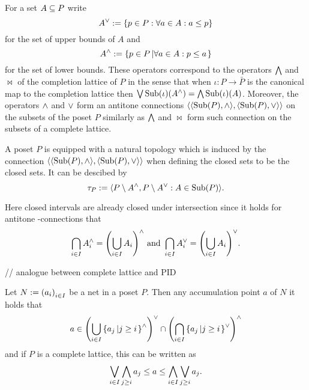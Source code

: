 \documentclass[8pt,a4paper]{article}
\begin{document}
\begin{definition}
    
\end{definition}%

%
\begin{definition}
    For a set $A\subseteq P$ write
    $$A^{\join}:=\set{p\in P: \forall a\in A: a\leq p}$$
    for the set of upper bounds of $A$ and
    $$A^{\meet}:=\set{p\in P}[\forall a\in A: p\leq a]$$
    for the set of lower bounds. These operators correspond to the operators $\mathop\mathrm{\bigwedge}$ and $\Join$ of the completion lattice of $P$ in the sense that when $\iota:P\to \bar{P}$ is the canonical map to the completion lattice then $\mathop\mathrm{\bigvee}\mathop\mathrm{Sub}\nolimits(\iota)(A^{\wedge})=\mathop\mathrm{\bigwedge}\mathop\mathrm{Sub}\nolimits(\iota)(A)$. Moreover, the operators $\wedge$ and $\vee$ form an antitone  connections $\struct{\struct{\Sub(P),\meet},\struct{\Sub(P),\join}}$ on the subsets of the poset $P$ similarly as $\mathop\mathrm{\bigwedge}$ and $\Join$ form such connection on the subsets of a complete lattice. 
\end{definition}

\begin{definition}
    A poset $P$ is equipped with a natural topology which is induced by the  connection $\struct{\struct{\Sub(P),\meet},\struct{\Sub(P),\join}}$ when defining the closed sets to be the  closed sets. It can be descibed by $$\tau_P:=\gen{P\setminus A^{\meet},P\setminus A^{\join}: A\in\Sub(P)}.$$
\end{definition}
%
\begin{remark}
    Here closed intervals are already closed under intersection since it holds for antitone -connections that
    $$\bigcap_{i\in I}{A_i^{\wedge}}={\left(\bigcup_{i\in I}{A_i}\right)}^{\wedge} \textrm{ and } \bigcap_{i\in I}{A_i^{\vee}}={\left(\bigcup_{i\in I}{A_i}\right)}^{\vee}.$$
\end{remark}

// analogue between complete lattice and PID

\begin{lemma}
    Let $N:=\net[i\in I]{a_i}$ be a net in a poset $P$. Then any accumulation point $a$ of $N$ it holds that
    $$
    a\in {\left(\Setjoin_{i\in I}{\set{a_j}[j \geq i]^{\meet}}\right)}^{\join}\setmeet{\left(\Setmeet_{i\in I}\set{a_j}[j \geq i]^{\join}\right)}^{\meet}
    $$
    and if $P$ is a complete lattice, this can be written as
    $$
    \mathop\mathrm{\bigvee}_{i\in I}\mathop\mathrm{\bigwedge}_{j\geq i}{a_j}\leq a\leq \mathop\mathrm{\bigwedge}_{i\in I}\mathop\mathrm{\bigvee}_{j\geq i}{a_j}.
    $$
\end{lemma}%
\end{document}
